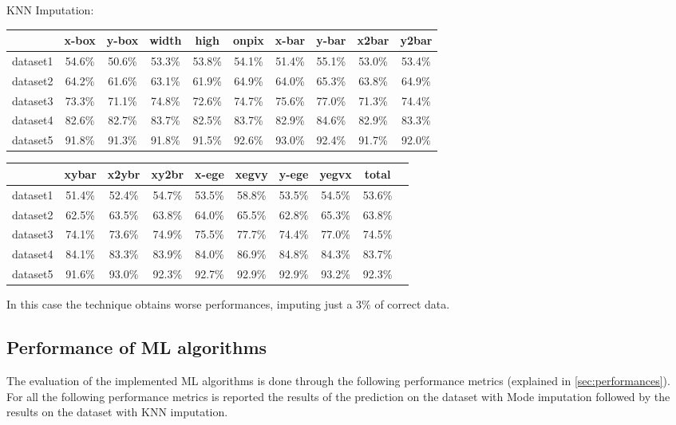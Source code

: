 \documentclass{article}
\begin{document}
KNN Imputation:
\begin{center}
    \begin{table}[H]
\begin{tabular}{|c|c|c|c|c|c|c|c|c|c|}
\hline
& x-box & y-box & width & high & onpix & x-bar & y-bar & x2bar & y2bar \\ \hline
dataset1 & 54.6\% & 50.6\% & 53.3\% & 53.8\% & 54.1\% & 51.4\% & 55.1\% & 53.0\% & 53.4\% \\ \hline
dataset2 & 64.2\% & 61.6\% & 63.1\% & 61.9\% & 64.9\% & 64.0\% & 65.3\% & 63.8\% & 64.9\% \\ \hline
dataset3 & 73.3\% & 71.1\% & 74.8\% & 72.6\% & 74.7\% & 75.6\% & 77.0\% & 71.3\% & 74.4\% \\ \hline
dataset4 & 82.6\% & 82.7\% & 83.7\% & 82.5\% & 83.7\% & 82.9\% & 84.6\% & 82.9\% & 83.3\% \\ \hline
dataset5 & 91.8\% & 91.3\% & 91.8\% & 91.5\% & 92.6\% & 93.0\% & 92.4\% & 91.7\% & 92.0\% \\ \hline
\end{tabular}
\end{table}
\begin{table}[H]
\begin{tabular}{|c|c|c|c|c|c|c|c|c|c|}
\hline
& xybar & x2ybr & xy2br & x-ege & xegvy & y-ege & yegvx & total \\ \hline
dataset1 & 51.4\% & 52.4\% & 54.7\% & 53.5\% & 58.8\% & 53.5\% & 54.5\% & 53.6\% \\ \hline
dataset2 & 62.5\% & 63.5\% & 63.8\% & 64.0\% & 65.5\% & 62.8\% & 65.3\% & 63.8\% \\ \hline
dataset3 & 74.1\% & 73.6\% & 74.9\% & 75.5\% & 77.7\% & 74.4\% & 77.0\% & 74.5\% \\ \hline
dataset4 & 84.1\% & 83.3\% & 83.9\% & 84.0\% & 86.9\% & 84.8\% & 84.3\% & 83.7\% \\ \hline
dataset5 & 91.6\% & 93.0\% & 92.3\% & 92.7\% & 92.9\% & 92.9\% & 93.2\% & 92.3\% \\ \hline
\end{tabular}
\end{table}
\end{center}
In this case the technique obtains worse performances, imputing just a 3\% of correct data.

\subsection*{Performance of ML algorithms}
The evaluation of the implemented ML algorithms is done through the following performance metrics (explained in \ref{sec:performances}).\\
For all the following performance metrics is reported the results of the prediction on the dataset with Mode imputation followed by the results on the dataset with KNN imputation.
\end{document}
